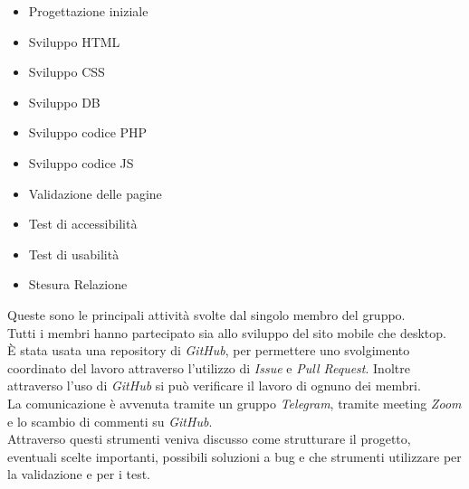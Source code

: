 \begin{itemize}
	\begin{itemize}
		\item Progettazione iniziale
		\item Sviluppo HTML
		\item Sviluppo CSS
		\item Sviluppo DB
		\item Sviluppo codice PHP
		\item Sviluppo codice JS
		\item Validazione delle pagine
		\item Test di accessibilità
		\item Test di usabilità
		\item Stesura Relazione
	\end{itemize}
\end{itemize}

Queste sono le principali attività svolte dal singolo membro del gruppo.\\
Tutti i membri hanno partecipato sia allo sviluppo del sito mobile che desktop.\\
È stata usata una repository di \emph{GitHub}, per permettere uno svolgimento coordinato del lavoro attraverso l'utilizzo di \emph{Issue} e \emph{Pull Request}. Inoltre attraverso l'uso di \emph{GitHub} si può verificare il lavoro di ognuno dei membri.\\
La comunicazione è avvenuta tramite un gruppo \emph{Telegram}, tramite meeting \emph{Zoom} e lo scambio di commenti su \emph{GitHub}.\\
Attraverso questi strumenti veniva discusso come strutturare il progetto, eventuali scelte importanti, possibili soluzioni a bug e che strumenti utilizzare per la validazione e per i test.